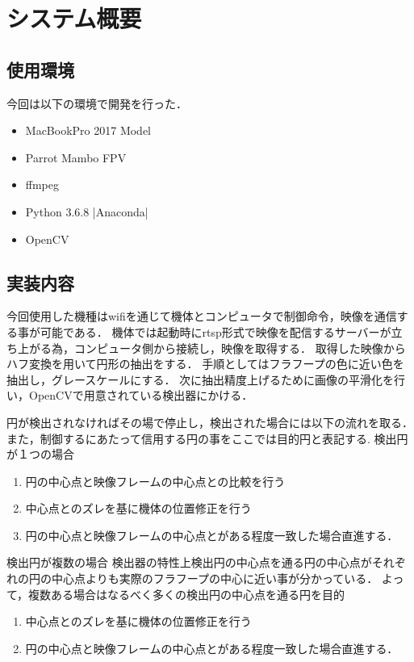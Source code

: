 \section{システム概要}
\subsection{使用環境}
今回は以下の環境で開発を行った．
\begin{itemize}
  \item MacBookPro 2017 Model
  \item Parrot Mambo FPV
  \item ffmpeg
  \item Python 3.6.8 |Anaconda|
  \item OpenCV
\end{itemize}


\subsection{実装内容}
今回使用した機種はwifiを通じて機体とコンピュータで制御命令，映像を通信する事が可能である．
機体では起動時にrtsp形式で映像を配信するサーバーが立ち上がる為，コンピュータ側から接続し，映像を取得する．
取得した映像からハフ変換\cite{hough}を用いて円形の抽出をする．
手順としてはフラフープの色に近い色を抽出し，グレースケールにする．
次に抽出精度上げるために画像の平滑化を行い，OpenCVで用意されている検出器にかける．

円が検出されなければその場で停止し，検出された場合には以下の流れを取る．
また，制御するにあたって信用する円の事をここでは目的円と表記する.
検出円が１つの場合
\begin{enumerate}
  \item 円の中心点と映像フレームの中心点との比較を行う
  \item 中心点とのズレを基に機体の位置修正を行う
  \item 円の中心点と映像フレームの中心点とがある程度一致した場合直進する．
\end{enumerate}

検出円が複数の場合
検出器の特性上検出円の中心点を通る円の中心点がそれぞれの円の中心点よりも実際のフラフープの中心に近い事が分かっている．
よって，複数ある場合はなるべく多くの検出円の中心点を通る円を目的
\begin{enumerate}
  \item 中心点とのズレを基に機体の位置修正を行う
  \item 円の中心点と映像フレームの中心点とがある程度一致した場合直進する．
\end{enumerate}
